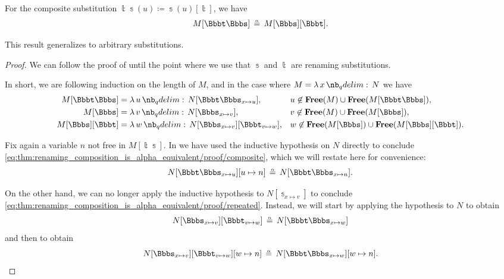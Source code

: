 \begin{proposition}\label{thm:substitution_composition_is_alpha_equivalent}
  For the composite substitution \( \Bbbt\Bbbs(u) \coloneqq \Bbbs(u)[\Bbbt] \), we have
  \begin{equation}\label{eq:thm:substitution_composition_is_alpha_equivalent}
    M[\Bbbt\Bbbs] \aequiv M[\Bbbs][\Bbbt].
  \end{equation}
\end{proposition}
\begin{comments}
  \item This result generalizes  to arbitrary substitutions.
\end{comments}
\begin{proof}
  We can follow the proof of  until the point where we use that \( \Bbbs \) and \( \Bbbt \) are renaming substitutions.

  In short, we are following induction on the length of \( M \), and in the case where \( M = \qabs x N \) we have
  \begin{align*}
    M[\Bbbt\Bbbs]   &= \qabs u N[\Bbbt\Bbbs_{x \mapsto u}],                 &&u \not\in \op*{Free}(M) \cup \op*{Free}(M[\Bbbt\Bbbs]), \\
    M[\Bbbs]        &= \qabs v N[\Bbbs_{x \mapsto v}],                      &&v \not\in \op*{Free}(M) \cup \op*{Free}(M[\Bbbs]), \\
    M[\Bbbs][\Bbbt] &= \qabs w N[\Bbbs_{x \mapsto v}][\Bbbt_{v \mapsto w}], &&w \not\in \op*{Free}(M[\Bbbs]) \cup \op*{Free}(M[\Bbbs][\Bbbt]).
  \end{align*}

  Fix again a variable \( n \) not free in \( M[\Bbbt\Bbbs] \). In  we have used the inductive hypothesis on \( N \) directly to conclude \eqref{eq:thm:renaming_composition_is_alpha_equivalent/proof/composite}, which we will restate here for convenience:
  \begin{equation}\label{eq:thm:substitution_composition_is_alpha_equivalent/proof/composite}
    N[\Bbbt\Bbbs_{x \mapsto u}][u \mapsto n] \aequiv N[\Bbbt\Bbbs_{x \mapsto n}].
  \end{equation}

  On the other hand, we can no longer apply the inductive hypothesis to \( N[\Bbbs_{x \mapsto v}] \) to conclude \eqref{eq:thm:renaming_composition_is_alpha_equivalent/proof/repeated}. Instead, we will start by applying the hypothesis to \( N \) to obtain
  \begin{equation*}
    N[\Bbbs_{x \mapsto v}][\Bbbt_{v \mapsto w}] \aequiv N[\Bbbt\Bbbs_{x \mapsto w}]
  \end{equation*}
  and then  to obtain
  \begin{equation*}
    N[\Bbbs_{x \mapsto v}][\Bbbt_{v \mapsto w}][w \mapsto n] \aequiv N[\Bbbt\Bbbs_{x \mapsto w}][w \mapsto n].
  \end{equation*}


\end{proof}
